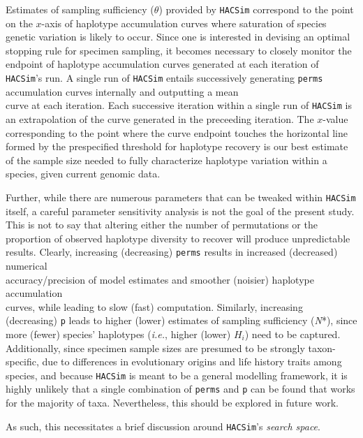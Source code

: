  

Estimates of sampling sufficiency ($\theta$) provided by {\tt HACSim} correspond to the point on the $x$-axis of haplotype accumulation curves where saturation of species genetic variation is likely to occur. Since one is interested in devising an optimal stopping rule for specimen sampling, it becomes necessary to closely monitor the endpoint of haplotype accumulation curves generated at each iteration of {\tt HACSim}'s run. A single run of {\tt HACSim} entails successively generating {\tt perms} accumulation curves internally and outputting a mean \\ curve at each iteration. Each successive iteration within a single run of {\tt HACSim} is an extrapolation of the curve generated in the preceeding iteration. The $x$-value corresponding to the point where the curve endpoint touches the horizontal line formed by the prespecified threshold for haplotype recovery is our best estimate of the sample size needed to fully characterize haplotype variation within a species, given current genomic data. 

Further, while there are numerous parameters that can be tweaked within {\tt HACSim} itself, a careful parameter sensitivity analysis is not the goal of the present study. This is not to say that altering either the number of permutations or the proportion of observed haplotype diversity to recover will produce unpredictable results. Clearly, increasing (decreasing) {\tt perms} results in increased (decreased) numerical \\ accuracy/precision of model estimates and smoother (noisier) haplotype accumulation \\ curves, while leading to slow (fast) computation. Similarly, increasing (decreasing) {\tt p} leads to higher (lower) estimates of sampling sufficiency (\textit{N}*), since more (fewer) species' haplotypes (\textit{i.e.}, higher (lower) $H_i$) need to be captured. Additionally, since specimen sample sizes are presumed to be strongly taxon-specific, due to differences in evolutionary origins and life history traits among species, and because {\tt HACSim} is meant to be a general modelling framework, it is highly unlikely that a single combination of {\tt perms} and {\tt p} can be found that works for the majority of taxa. Nevertheless, this should be explored in future work.


As such, this necessitates a brief discussion around {\tt HACSim}'s \textit{search space}.

\vspace{5mm}

